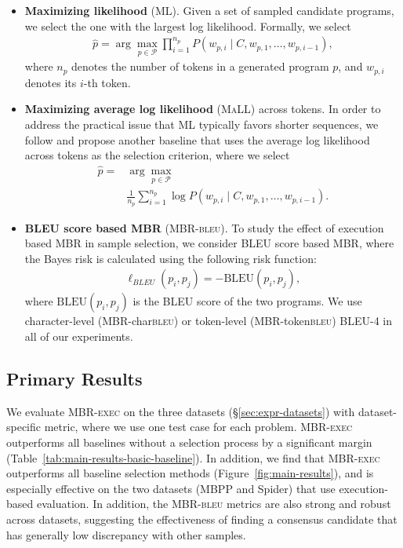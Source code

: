 \documentclass[11pt]{article}
\newcommand{\mbrexec}{\textsc{MBR-exec}\xspace}
\newcommand{\mbrbleu}{\textsc{MBR-bleu}\xspace}
\newcommand{\maxlikelihood}{ML\xspace}
\newcommand{\maxavglikelihood}{\textsc{MaLL}\xspace}
\begin{document}
\begin{itemize}[leftmargin=*]\setlength{\itemsep}{0pt}
    \item \textbf{Maximizing likelihood} (\maxlikelihood). Given a set of sampled candidate programs, we select the one with the largest log likelihood. Formally, we select 
    \begin{align*}
        \hat{p} = \arg\max_{p \in \mathcal{P}} \prod_{i=1}^{n_p} P(w_{p, i} \mid C, w_{p, 1}, \ldots, w_{p, i-1}),
    \end{align*}
    where $n_p$ denotes the number of tokens in a generated program $p$, and $w_{p, i}$ denotes its $i$-th token.
    \item \textbf{Maximizing average log likelihood} (\maxavglikelihood) across tokens. In order to address the practical issue that ML typically favors shorter sequences, we follow \citet{chen2021evaluating} and propose another baseline that uses the average log likelihood across tokens as the selection criterion, where we select 
    \begin{align*}
        \hat{p} = & \arg\max_{p \in \mathcal{P}} \\
        & \frac{1}{n_p} \sum_{i=1}^{n_p} \log P(w_{p, i} \mid C, w_{p, 1}, \ldots, w_{p, i-1}).
    \end{align*}
    \item \textbf{BLEU score based MBR} (\mbrbleu). To study the effect of execution based MBR in sample selection, we consider BLEU score based MBR, where the Bayes risk is calculated using the following risk function:
    \begin{align*}
        \ell_\textit{BLEU}(p_i, p_j) = -\text{BLEU}(p_i, p_j),
    \end{align*}
    where $\text{BLEU}(p_i, p_j)$ is the BLEU score of the two programs. We use character-level (MBR-char\textsc{bleu}) or token-level (MBR-token\textsc{bleu}) BLEU-4 in all of our experiments.
\end{itemize}
 \subsection{Primary Results}
\label{sec:expr-results-main}
We evaluate \mbrexec on the three datasets (\S\ref{sec:expr-datasets}) with dataset-specific metric, where we use one test case for each problem. 
\mbrexec outperforms all baselines without a selection process by a significant margin (Table~\ref{tab:main-results-basic-baseline}).
In addition, we find that \mbrexec outperforms all baseline selection methods (Figure~\ref{fig:main-results}), and is especially effective on the two datasets (MBPP and Spider) that use execution-based evaluation. In addition, the \mbrbleu metrics are also strong and robust across datasets, suggesting the effectiveness of finding a consensus candidate that has generally low discrepancy with other samples. 
\end{document}
